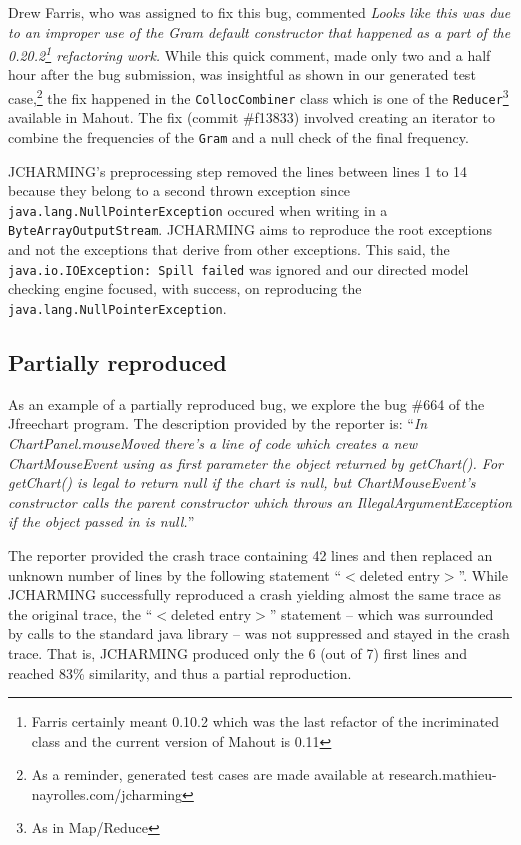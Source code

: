 \documentclass[times]{smrauth}
\begin{document}
Drew Farris, who was assigned to fix this bug, commented {\it Looks like this was due to an improper use of the Gram default constructor that happened as a part of the 0.20.2\footnote{Farris certainly meant 0.10.2 which was the last refactor of the incriminated class and the current version of Mahout is 0.11} refactoring work.} 
While this quick comment, made only two and a half hour after the bug submission, was insightful as shown in our generated test case,\footnote{As a reminder, generated test cases are made available at research.mathieu-nayrolles.com/jcharming} the fix happened in the {\tt CollocCombiner} class which is one of the {\tt Reducer}\footnote{As in Map/Reduce} available in Mahout. 
The fix (commit \#f13833) involved creating an iterator to combine the frequencies of the {\tt Gram} and a null check of the final frequency.

JCHARMING's preprocessing step
removed the lines between lines 1 to 14 because they
belong to a second thrown exception since {\tt java.lang.NullPointerException} occured when writing in a {\tt ByteArrayOutputStream}. 
JCHARMING aims to reproduce the root exceptions and not the exceptions that derive from other exceptions. 
This said, the {\tt java.io.IOException: Spill failed} was ignored and our directed model checking engine focused, with success, on reproducing the {\tt java.lang.NullPointerException}.

\subsection{Partially reproduced}

As an example of a partially reproduced bug, we explore the
bug \#664 of the Jfreechart program. The description provided
by the reporter is: ``{\it In ChartPanel.mouseMoved there's a line
of code which creates a new ChartMouseEvent using as first
parameter the object returned by getChart(). For getChart() is
legal to return null if the chart is null, but ChartMouseEvent's
constructor calls the parent constructor which throws an
IllegalArgumentException if the object passed in is null.}''

The reporter provided the crash trace containing 42 lines and
then replaced an unknown number of lines by the following
statement ``$<$deleted entry$>$''. While JCHARMING successfully reproduced a crash yielding almost the same trace
as the original trace, the ``$<$deleted entry$>$'' statement -- which
was surrounded by calls to the standard java library -- was not
suppressed and stayed in the crash trace. That is,
JCHARMING produced only the 6 (out of 7) first lines and
reached 83\% similarity, and thus a partial reproduction.
\end{document}
